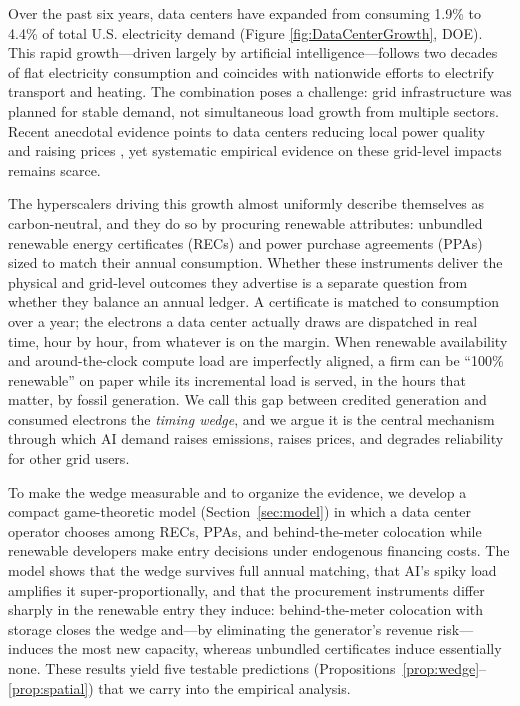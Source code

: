 \documentclass[a4paper,fleqn,longmktitle]{cas-sc}
\theoremstyle{plain}
\theoremstyle{definition}
\begin{document}
Over the past six years, data centers have expanded from consuming 1.9\% to 4.4\% of total U.S. electricity demand (Figure \ref{fig:DataCenterGrowth}, DOE). This rapid growth—driven largely by artificial intelligence—follows two decades of flat electricity consumption and coincides with nationwide efforts to electrify transport and heating. The combination poses a challenge: grid infrastructure was planned for stable demand, not simultaneous load growth from multiple sectors. Recent anecdotal evidence points to data centers reducing local power quality and raising prices \cite{Nicoletti_Malik_Tartar_2024}, yet systematic empirical evidence on these grid-level impacts remains scarce.

The hyperscalers driving this growth almost uniformly describe themselves as carbon-neutral, and they do so by procuring renewable attributes: unbundled renewable energy certificates (RECs) and power purchase agreements (PPAs) sized to match their annual consumption. Whether these instruments deliver the physical and grid-level outcomes they advertise is a separate question from whether they balance an annual ledger. A certificate is matched to consumption over a year; the electrons a data center actually draws are dispatched in real time, hour by hour, from whatever is on the margin. When renewable availability and around-the-clock compute load are imperfectly aligned, a firm can be ``100\% renewable'' on paper while its incremental load is served, in the hours that matter, by fossil generation. We call this gap between credited generation and consumed electrons the \emph{timing wedge}, and we argue it is the central mechanism through which AI demand raises emissions, raises prices, and degrades reliability for other grid users.

To make the wedge measurable and to organize the evidence, we develop a compact game-theoretic model (Section~\ref{sec:model}) in which a data center operator chooses among RECs, PPAs, and behind-the-meter colocation while renewable developers make entry decisions under endogenous financing costs. The model shows that the wedge survives full annual matching, that AI's spiky load amplifies it super-proportionally, and that the procurement instruments differ sharply in the renewable entry they induce: behind-the-meter colocation with storage closes the wedge and---by eliminating the generator's revenue risk---induces the most new capacity, whereas unbundled certificates induce essentially none. These results yield five testable predictions (Propositions~\ref{prop:wedge}--\ref{prop:spatial}) that we carry into the empirical analysis.
\end{document}
